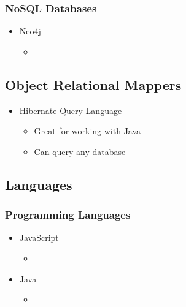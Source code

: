 \subsubsection{NoSQL Databases}
\begin{itemize}
	\item Neo4j
	\begin{itemize}
	\item 
	\end{itemize}
\end{itemize}

\subsection{Object Relational Mappers}
\begin{itemize}
	\item Hibernate Query Language
	\begin{itemize}
	\item Great for working with Java
	\item Can query any database
	\end{itemize}
\end{itemize}

\subsection{Languages}
\subsubsection{Programming Languages}
\begin{itemize}
	\item JavaScript
	\begin{itemize}
	\item 
	\end{itemize}
	
	\item Java
	\begin{itemize}
	\item 
	\end{itemize}
\end{itemize}

